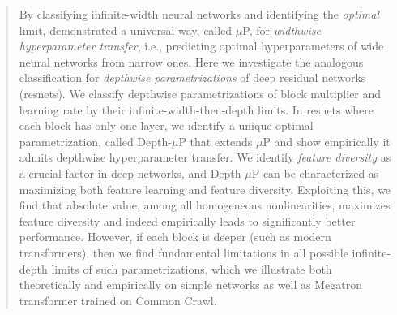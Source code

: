 \begin{abstract}

By classifying infinite-width neural networks and identifying the \emph{optimal} limit, \cite{yang2021tensor,yang2022tensor} demonstrated a universal way, called $\mu$P, for \emph{widthwise hyperparameter transfer}, i.e., predicting optimal hyperparameters of wide neural networks from narrow ones.
Here we investigate the analogous classification for \emph{depthwise parametrizations} of deep residual networks (resnets). 
We classify depthwise parametrizations of block multiplier and learning rate by their infinite-width-then-depth limits.
In resnets where each block has only one layer, we identify a unique optimal parametrization, called Depth-$\mu$P that extends $\mu$P and show empirically it admits depthwise hyperparameter transfer.
We identify \emph{feature diversity} as a crucial factor in deep networks, and  Depth-$\mu$P can be characterized as maximizing both feature learning and feature diversity.
Exploiting this, we find that absolute value, among all homogeneous nonlinearities,  maximizes feature diversity and indeed empirically leads to significantly better performance.
However, if each block is deeper (such as modern transformers), then we find fundamental limitations in all possible infinite-depth limits of such parametrizations, which we illustrate both theoretically and empirically on simple networks as well as Megatron transformer trained on Common Crawl.

\end{abstract}